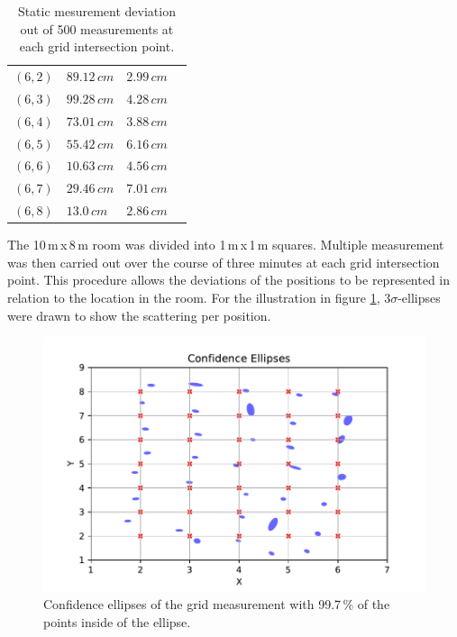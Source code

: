 \documentclass[conference, a4paper]{IEEEtran}
\begin{document}
\begin{table}[hbt!]
\begin{tabular}{l l l c}
		$(6,2)$ & $89.12\,cm$ & $2.99\,cm$\\
		$(6,3)$ & $99.28\,cm$ & $4.28\,cm$\\
		$(6,4)$ & $73.01\,cm$ & $3.88\,cm$\\
		$(6,5)$ & $55.42\,cm$ & $6.16\,cm$\\
		$(6,6)$ & $10.63\,cm$ & $4.56\,cm$\\
		$(6,7)$ & $29.46\,cm$ & $7.01\,cm$\\
		$(6,8)$ & $13.0\,cm$ & $2.86\,cm$\\
		
	\end{tabular}
	\caption{Static mesurement deviation out of 500 measurements at each grid intersection point.}
	\label{table:measurements}
\end{table}

The 10\,m\,x\,8\,m room was divided into 1\,m\,x\,1\,m squares. 
Multiple measurement was then carried out over the course of three minutes at each grid intersection point.
This procedure allows the deviations of the positions to be represented in relation to the location in the room.
For the illustration in figure \ref{fig:statistics}, $3\sigma$-ellipses were drawn to show the scattering per position.

\begin{figure}[hbt!]
	\includegraphics[scale=0.63]{pic/position_plot.pdf}
	\caption{Confidence ellipses of the grid measurement with 99.7\,\% of the points inside of the ellipse.}
	\label{fig:statistics}
\end{figure}
\end{document}
